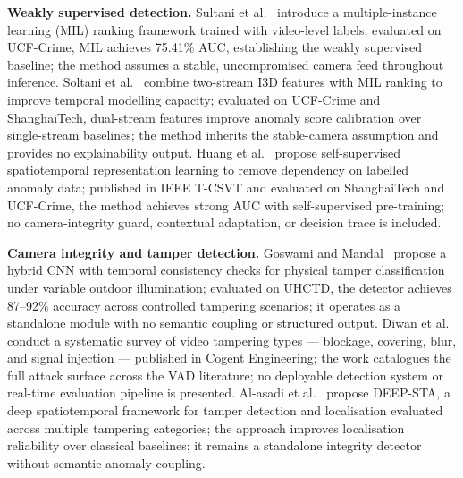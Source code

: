 \documentclass[sensors,article,submit,pdftex,moreauthors]{Definitions/mdpi}
\begin{document}
\textbf{Weakly supervised detection.}
Sultani et al.~\cite{sultani2018realworld} introduce a multiple-instance learning (MIL) ranking framework trained with video-level labels; evaluated on UCF-Crime, MIL achieves 75.41\% AUC, establishing the weakly supervised baseline; the method assumes a stable, uncompromised camera feed throughout inference.
Soltani et al.~\cite{soltani2024i3dAnomaly} combine two-stream I3D features with MIL ranking to improve temporal modelling capacity; evaluated on UCF-Crime and ShanghaiTech, dual-stream features improve anomaly score calibration over single-stream baselines; the method inherits the stable-camera assumption and provides no explainability output.
Huang et al.~\cite{huang2024selfsupervised} propose self-supervised spatiotemporal representation learning to remove dependency on labelled anomaly data; published in IEEE T-CSVT and evaluated on ShanghaiTech and UCF-Crime, the method achieves strong AUC with self-supervised pre-training; no camera-integrity guard, contextual adaptation, or decision trace is included.
 
\textbf{Camera integrity and tamper detection.}
Goswami and Mandal~\cite{goswami2023hybrid} propose a hybrid CNN with temporal consistency checks for physical tamper classification under variable outdoor illumination; evaluated on UHCTD, the detector achieves 87--92\% accuracy across controlled tampering scenarios; it operates as a standalone module with no semantic coupling or structured output.
Diwan et al.~\cite{diwan2024systematic} conduct a systematic survey of video tampering types — blockage, covering, blur, and signal injection — published in Cogent Engineering; the work catalogues the full attack surface across the VAD literature; no deployable detection system or real-time evaluation pipeline is presented.
Al-asadi et al.~\cite{deepsta2024} propose DEEP-STA, a deep spatiotemporal framework for tamper detection and localisation evaluated across multiple tampering categories; the approach improves localisation reliability over classical baselines; it remains a standalone integrity detector without semantic anomaly coupling.
 
\end{document}
